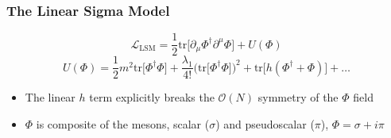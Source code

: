 \documentclass[10pt,a4paper,usenames,dvipsnames]{beamer}
\begin{document}
\begin{frame}
\begin{columns}[c]
{%
    }
  \end{columns}
\end{frame}

\footnotesize

\begin{frame}
  \frametitle{The Linear Sigma Model}
  \begin{block}{}
    \begin{equation*}
      \mathcal{L}_{\text{LSM}} = \frac{1}{2}\text{tr}\big[\partial_{\mu}\Phi^{\dagger}\partial^{\mu}\Phi\big] + U(\Phi)
    \end{equation*}
    \begin{equation*}
      U(\Phi) = \frac{1}{2}m^2\text{tr}\big[\Phi^{\dagger}\Phi\big] + \frac{\lambda_1}{4!}\Big(\text{tr}\big[\Phi^{\dagger}\Phi\big]\Big)^2 + 
      \text{tr}\big[h(\Phi^{\dagger} + \Phi)\big]  + \dots
    \end{equation*}
  \end{block}

  \begin{itemize}
    \item The linear $h$ term explicitly breaks the $\mathcal{O}(N)$ symmetry of the $\Phi$ field
    \item $\Phi$ is composite of the mesons, scalar ($\sigma$) and pseudoscalar ($\pi$), $\Phi = \sigma + i\pi$
  \end{itemize}

\end{frame}
\end{document}

